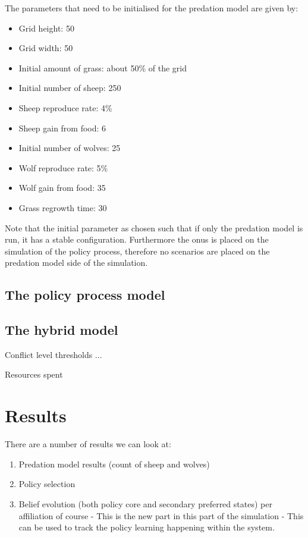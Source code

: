 \documentclass[12pt]{article}
\begin{document}
The parameters that need to be initialised for the predation model are given by:

\begin{itemize}
\item Grid height: 50
\item Grid width: 50
\item Initial amount of grass: about 50\% of the grid
\item Initial number of sheep: 250
\item Sheep reproduce rate: 4\%
\item Sheep gain from food: 6
\item Initial number of wolves: 25
\item Wolf reproduce rate: 5\%
\item Wolf gain from food: 35
\item Grass regrowth time: 30
\end{itemize}

Note that the initial parameter as chosen such that if only the predation model is run, it has a stable configuration. Furthermore the onus is placed on the simulation of the policy process, therefore no scenarios are placed on the predation model side of the simulation.


\subsection{The policy process model}

\subsection{The hybrid model}

Conflict level thresholds ...

Resources spent


\section{Results}
\label{sec:}

There are a number of results we can look at:

\begin{enumerate}
\item Predation model results (count of sheep and wolves)
\item Policy selection
\item Belief evolution (both policy core and secondary preferred states) per affiliation of course - This is the new part in this part of the simulation - This can be used to track the policy learning happening within the system.
\end{enumerate}
\end{document}
